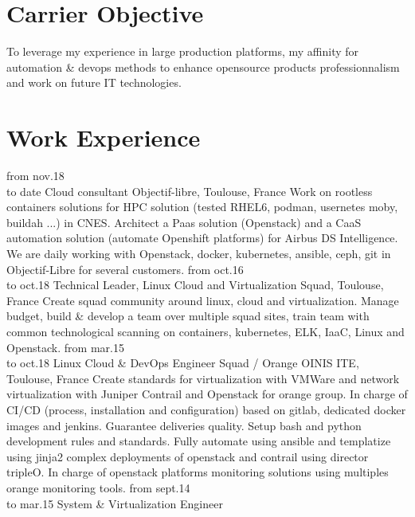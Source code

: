 \documentclass[]{friggeri-cv}
\begin{document}
\section{Carrier Objective}
    
    To leverage my experience in large production platforms, my affinity
    for automation \& devops methods to enhance opensource products professionnalism
    and work on future IT technologies. 

\section{Work Experience}
\begin{entrylist}
    \entry
        {from nov.18\\to date}
        {Cloud consultant}
        {Objectif-libre, Toulouse, France}
	{Work on rootless containers solutions for HPC solution (tested RHEL6, podman, usernetes
        moby, buildah ...) in CNES. Architect a Paas solution (Openstack) and 
        a CaaS automation solution (automate Openshift platforms) for Airbus DS Intelligence.
        We are daily working with Openstack, docker, kubernetes, ansible, ceph, git in Objectif-Libre
        for several customers.
        }
    \entry
        {from oct.16\\to oct.18}
        {Technical Leader, Linux Cloud and Virtualization}
        {Squad, Toulouse, France}
	{Create squad community around linux, cloud and virtualization. Manage budget, build \& develop a 
        team over multiple squad sites, train team with common technological 
        scanning on containers, kubernetes, ELK, IaaC, Linux and Openstack.
        }
    \entry
        {from  mar.15\\to oct.18}
        {Linux Cloud \& DevOps Engineer}
        {Squad / Orange OINIS ITE, Toulouse, France}
        {Create standards for virtualization with VMWare and network virtualization with Juniper 
        Contrail and Openstack for orange group. In charge of CI/CD (process,
        installation and configuration) based on gitlab, dedicated docker images and jenkins.
        Guarantee deliveries quality. Setup bash and python development rules and standards.
        Fully automate using ansible and templatize using jinja2 complex deployments of openstack and
        contrail using director tripleO. In charge of openstack platforms monitoring solutions
        using multiples orange monitoring tools.
        }
    \entry
        {from sept.14\\to mar.15}
	{System \& Virtualization Engineer}

\end{entrylist}
\end{document}
